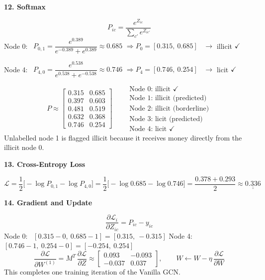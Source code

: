 \documentclass[12pt,a4paper]{article}
\newcommand{\h}[1]{\par\needspace{6\baselineskip}\medskip\textbf{\large #1}\par}
\begin{document}
\h{12. Softmax}
\[
  P_{ic} = \frac{e^{Z_{ic}}}{\sum_{c'} e^{Z_{ic'}}}
\]
Node 0: \ $P_{0,1} = \dfrac{e^{0.389}}{e^{-0.389} + e^{0.389}} \approx 0.685$
\quad $\Rightarrow P_0 = [0.315,\ 0.685]$ \ $\rightarrow$ illicit $\checkmark$

Node 4: \ $P_{4,0} = \dfrac{e^{0.538}}{e^{0.538} + e^{-0.538}} \approx 0.746$
\quad $\Rightarrow P_4 = [0.746,\ 0.254]$ \ $\rightarrow$ licit $\checkmark$

\[
  P \approx \begin{bmatrix}
  0.315 & 0.685\\ 0.397 & 0.603\\ 0.481 & 0.519\\ 0.632 & 0.368\\ 0.746 & 0.254
  \end{bmatrix}
  \qquad
  \begin{array}{l}
  \text{Node 0: illicit } \checkmark\\ \text{Node 1: illicit (predicted)}\\ \text{Node 2: illicit (borderline)}\\
  \text{Node 3: licit (predicted)}\\ \text{Node 4: licit } \checkmark
  \end{array}
\]
Unlabelled node 1 is flagged illicit because it receives money directly from the illicit node 0.

\h{13. Cross-Entropy Loss}
\[
  \mathcal L = \frac12\big[-\log P_{0,1} - \log P_{4,0}\big] = \frac12\big[-\log 0.685 - \log 0.746\big]
  = \frac{0.378 + 0.293}{2} \approx \underline{\underline{0.336}}
\]

\h{14. Gradient and Update}
\[
  \frac{\partial \mathcal L_i}{\partial Z_{ic}} = P_{ic} - y_{ic}
\]
Node 0: \ $[0.315 - 0,\ 0.685 - 1] = [0.315,\ -0.315]$ \qquad
Node 4: \ $[0.746 - 1,\ 0.254 - 0] = [-0.254,\ 0.254]$
\[
  \frac{\partial\mathcal L}{\partial W^{(1)}} = M^T\,\frac{\partial\mathcal L}{\partial Z} \approx
  \begin{bmatrix} 0.093 & -0.093\\ -0.037 & 0.037 \end{bmatrix},
  \qquad
  W \leftarrow W - \eta\,\frac{\partial\mathcal L}{\partial W}
\]
This completes one training iteration of the Vanilla GCN.
\end{document}
